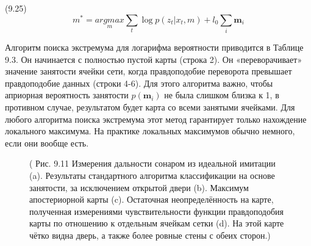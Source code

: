 \documentclass[10pt,a4paper]{article}
\begin{document}
(9.25)
$$m^*=\underset{m}{argmax}\sum_t \log p(z_t|x_t,m)+l_0\sum_i \textbf{m}_i$$

Алгоритм поиска экстремума для логарифма вероятности приводится в Таблице 9.3. Он начинается с полностью пустой карты (строка 2). Он «переворачивает» значение занятости ячейки сети, когда правдоподобие переворота превышает правдоподобие данных (строки 4-6).  Для этого алгоритма важно, чтобы априорная вероятность занятости $p(\textbf{m}_i)$ не была слишком близка к 1, в противном случае, результатом будет карта со всеми занятыми ячейками. Для любого алгоритма поиска экстремума этот метод гарантирует только нахождение локального максимума. На практике локальных максимумов обычно немного, если они вообще есть.

\begin{figure}[H]
	\caption{ ( Рис. 9.11 Измерения дальности сонаром из идеальной имитации (a). Результаты стандартного алгоритма классификации на основе занятости, за исключением открытой двери (b).  Максимум апостериорной карты (c). Остаточная неопределённость на карте, полученная измерениями чувствительности функции правдоподобия карты по отношению к отдельным ячейкам сетки (d). На этой карте чётко видна дверь, а также более ровные стены с обеих сторон.)}
	\label{fig:911orig}
\end{figure}
\end{document}
